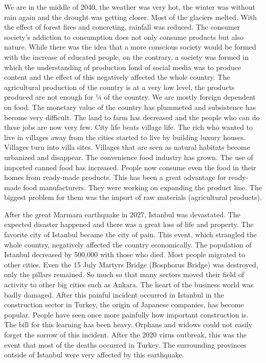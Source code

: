 \documentclass[]{book}
\begin{document}
We are in the middle of 2040, the weather was very hot, the winter was without rain again and the drought was getting closer. Most of the glaciers melted. With the effect of forest fires and concreting, rainfall was reduced. The consumer society's addiction to consumption does not only consume products but also nature. While there was the idea that a more conscious society would be formed with the increase of educated people, on the contrary, a society was formed in which the understanding of production fond of social media was to produce content and the effect of this negatively affected the whole country. The agricultural production of the country is at a very low level, the products produced are not enough for ¼ of the country. We are mostly foreign dependent on food. The monetary value of the country has plummeted and subsistence has become very difficult. The land to farm has decreased and the people who can do these jobs are now very few. City life beats village life. The rich who wanted to live in villages away from the cities started to live by building luxury houses. Villages turn into villa sites. Villages that are seen as natural habitats become urbanized and disappear. The convenience food industry has grown. The use of imported canned food has increased. People now consume even the food in their homes from ready-made products. This has been a great advantage for ready-made food manufacturers. They were working on expanding the product line. The biggest problem for them was the import of raw materials (agricultural products).

After the great Marmara earthquake in 2027, Istanbul was devastated. The expected disaster happened and there was a great loss of life and property. The favorite city of Istanbul became the city of pain. This event, which strangled the whole country, negatively affected the country economically. The population of Istanbul decreased by 500,000 with those who died. Most people migrated to other cities. Even the 15 July Martyrs Bridge (Bosphorus Bridge) was destroyed, only the pillars remained. So much so that many sectors moved their field of activity to other big cities such as Ankara. The heart of the business world was badly damaged. After this painful incident occurred in Istanbul in the construction sector in Turkey, the origin of Japanese companies, has become popular. People have seen once more painfully how important construction is. The bill for this learning has been heavy. Orphans and widows could not easily forget the sorrow of this incident. After the 2020 virus outbreak, this was the event that most of the deaths occurred in Turkey. The surrounding provinces outside of Istanbul were very affected by this earthquake.
\end{document}
